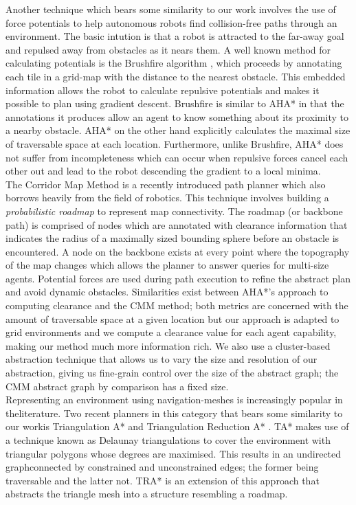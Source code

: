 Another technique which bears some similarity to our work involves the use of force potentials to help autonomous robots find collision-free paths through an environment. The basic intution is that a robot is attracted to the far-away goal and repulsed away from obstacles as it nears them. A well known method for calculating potentials is the Brushfire algorithm \cite{latombe91}, which proceeds by annotating each tile in a grid-map with the distance to the nearest obstacle. This embedded information allows the robot to calculate repulsive potentials and makes it possible to plan using gradient descent. \newline
Brushfire is similar to AHA* in that the annotations it produces allow an agent to know something about its proximity to a nearby obstacle. AHA* on the other hand explicitly calculates the maximal size of traversable space at each location. Furthermore, unlike Brushfire, AHA* does not suffer from incompleteness which can occur when repulsive forces cancel each other out and lead to the robot descending the gradient to a local minima.\\ \newline
The Corridor Map Method \cite{geraerts07} is a recently introduced path planner which also borrows heavily from the field of robotics. This technique involves building a \emph{probabilistic roadmap} to represent map connectivity. The roadmap (or backbone path) is comprised of nodes which are annotated with clearance information that indicates the radius of a maximally sized bounding sphere before an obstacle is encountered. A node on the backbone exists at every point where the topography of the map changes which allows the planner to answer queries for multi-size agents. Potential forces are used during path execution to refine the abstract plan and avoid dynamic obstacles. \newline
Similarities exist between AHA*'s approach to computing clearance and the CMM  method; both metrics are concerned with the amount of traversable space at a given location but our approach is adapted to grid environments and we compute a clearance value for each agent capability, making our method much more information rich. We also use a cluster-based abstraction technique that allows us to vary the size and resolution of our abstraction, giving us fine-grain control over the size of the abstract graph; the CMM abstract graph by comparison has a fixed size. \\ \newline
Representing an environment using navigation-meshes is increasingly popular in theliterature. Two recent planners in this category that bears some similarity to our workis Triangulation A* and Triangulation Reduction A* \cite{demyen07}. TA* makes use of a technique known as Delaunay triangulations to cover the environment with triangular polygons whose degrees are maximised. This results in an undirected graphconnected by constrained and unconstrained edges; the former being traversable and the latter not. TRA* is an extension of this approach that abstracts the triangle mesh into a structure resembling a roadmap. 
